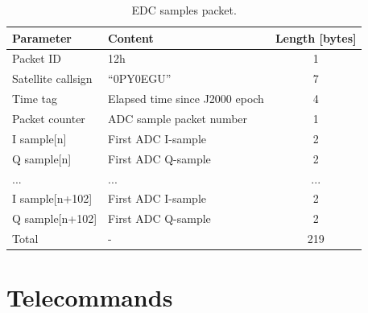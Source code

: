 \begin{table}[!h]
    \centering
    \begin{tabular}{llc}
        \toprule[1.5pt]
        \textbf{Parameter} & \textbf{Content}               & \textbf{Length [bytes]} \\
        \midrule
        Packet ID          & 12h                            & 1 \\
        Satellite callsign & ``0PY0EGU''                    & 7 \\
        Time tag           & Elapsed time since J2000 epoch & 4 \\
        Packet counter     & ADC sample packet number       & 1 \\
        I sample[n]        & First ADC I-sample             & 2 \\
        Q sample[n]        & First ADC Q-sample             & 2 \\
        ...                & ...                            & ... \\
        I sample[n+102]    & First ADC I-sample             & 2 \\
        Q sample[n+102]    & First ADC Q-sample             & 2 \\
        \midrule
        Total              & -                              & 219 \\
        \bottomrule[1.5pt]
    \end{tabular}
    \caption{EDC samples packet.}
    \label{tab:telemetry-edc-samples}
\end{table}

\section{Telecommands}

